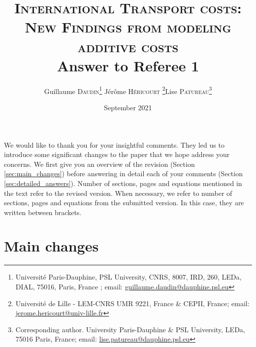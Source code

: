 \documentclass[a4paper,11pt]{article}
\begin{document}
\title{\textsc{International Transport costs:\\New Findings from modeling additive costs} \\
Answer to Referee 1}

\author{Guillaume \textsc{Daudin}\thanks{%
Université Paris-Dauphine, PSL University, CNRS, 8007, IRD, 260, LEDa, DIAL, 75016, Paris, France ; email: \url{guillaume.daudin@dauphine.psl.eu}}  \qquad J\'{e}r\^{o}me \textsc{H\'{e}ricourt} \thanks{Universit\'{e} de Lille - LEM-CNRS UMR 9221, France \& CEPII, France; email: \url{jerome.hericourt@univ-lille.fr}}\qquad Lise \textsc{Patureau}\thanks{Corresponding author.
University Paris-Dauphine \& PSL University, LEDa, 75016 Paris, France;  email: \url{lise.patureau@dauphine.psl.eu} } }


\date{September 2021}
 \maketitle
\bigskip

We would like to thank you for your insightful comments. They led us to introduce some
significant changes to the paper that we hope address your concerns. We first give you an overview
of the revision (Section \ref{sec:main_changes}) before answering in detail each of your comments (Section \ref{sec:detailed_answers}). Number of sections, pages and equations mentioned in the text refer to the revised version. When necessary, we refer to number of sections, pages and equations from the submitted version. In this case, they are written between brackets.

\section{Main changes \label{sec:main_changes}}
\end{document}
